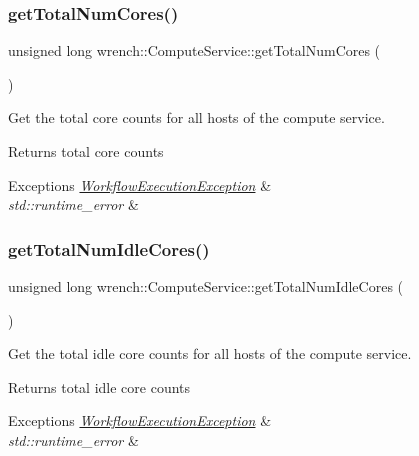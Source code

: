\subsubsection{\texorpdfstring{get\+Total\+Num\+Cores()}{getTotalNumCores()}}
{\footnotesize\ttfamily unsigned long wrench\+::\+Compute\+Service\+::get\+Total\+Num\+Cores (\begin{DoxyParamCaption}{ }\end{DoxyParamCaption})}



Get the total core counts for all hosts of the compute service. 

\begin{DoxyReturn}{Returns}
total core counts
\end{DoxyReturn}

\begin{DoxyExceptions}{Exceptions}
{\em \hyperlink{classwrench_1_1_workflow_execution_exception}{Workflow\+Execution\+Exception}} & \\
\hline
{\em std\+::runtime\+\_\+error} & \\
\hline
\end{DoxyExceptions}
\mbox{\label{classwrench_1_1_compute_service_a225719efa4cb6c3b910c20e8828cb789}} 
\subsubsection{\texorpdfstring{get\+Total\+Num\+Idle\+Cores()}{getTotalNumIdleCores()}}
{\footnotesize\ttfamily unsigned long wrench\+::\+Compute\+Service\+::get\+Total\+Num\+Idle\+Cores (\begin{DoxyParamCaption}{ }\end{DoxyParamCaption})}



Get the total idle core counts for all hosts of the compute service. 

\begin{DoxyReturn}{Returns}
total idle core counts
\end{DoxyReturn}

\begin{DoxyExceptions}{Exceptions}
{\em \hyperlink{classwrench_1_1_workflow_execution_exception}{Workflow\+Execution\+Exception}} & \\
\hline
{\em std\+::runtime\+\_\+error} & \\
\hline
\end{DoxyExceptions}
\mbox{\label{classwrench_1_1_compute_service_ae0a8acd4a82063250799e313f1d520d1}} 
